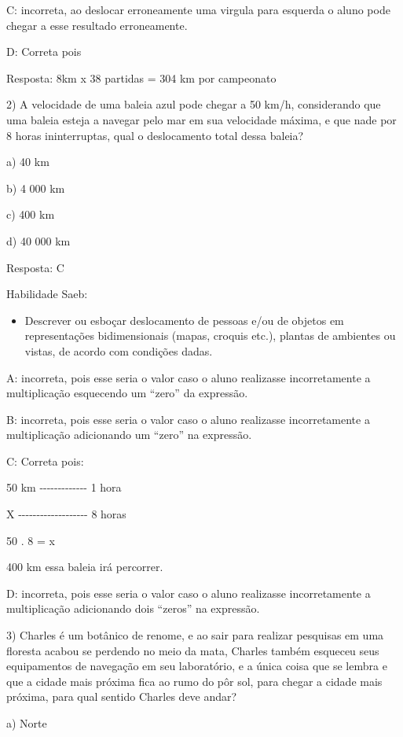 C: incorreta, ao deslocar erroneamente uma virgula para esquerda o aluno
pode chegar a esse resultado erroneamente.

D: Correta pois

Resposta: 8km x 38 partidas = 304 km por campeonato

2) A velocidade de uma baleia azul pode chegar a 50 km/h, considerando
que uma baleia esteja a navegar pelo mar em sua velocidade máxima, e que
nade por 8 horas ininterruptas, qual o deslocamento total dessa baleia?

a) 40 km

b) 4 000 km

c) 400 km

d) 40 000 km

Resposta: C

Habilidade Saeb:

\begin{itemize}
\tightlist
\item
  Descrever ou esboçar deslocamento de pessoas e/ou de objetos em
  representações bidimensionais (mapas, croquis etc.), plantas de
  ambientes ou vistas, de acordo com condições dadas.
\end{itemize}

A: incorreta, pois esse seria o valor caso o aluno realizasse
incorretamente a multiplicação esquecendo um ``zero'' da expressão.

B: incorreta, pois esse seria o valor caso o aluno realizasse
incorretamente a multiplicação adicionando um ``zero'' na expressão.

C: Correta pois:

50 km -\/-\/-\/-\/-\/-\/-\/-\/-\/-\/-\/-\/- 1 hora

X -\/-\/-\/-\/-\/-\/-\/-\/-\/-\/-\/-\/-\/-\/-\/-\/-\/-\/- 8 horas

50 . 8 = x

400 km essa baleia irá percorrer.

D: incorreta, pois esse seria o valor caso o aluno realizasse
incorretamente a multiplicação adicionando dois ``zeros'' na expressão.

3) Charles é um botânico de renome, e ao sair para realizar pesquisas em
uma floresta acabou se perdendo no meio da mata, Charles também esqueceu
seus equipamentos de navegação em seu laboratório, e a única coisa que
se lembra e que a cidade mais próxima fica ao rumo do pôr sol, para
chegar a cidade mais próxima, para qual sentido Charles deve andar?

a) Norte

